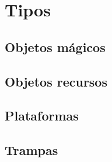 \section{Tipos} %


\subsection{Objetos mágicos}

\subsection{Objetos recursos}

\subsection{Plataformas}

\subsection{Trampas}